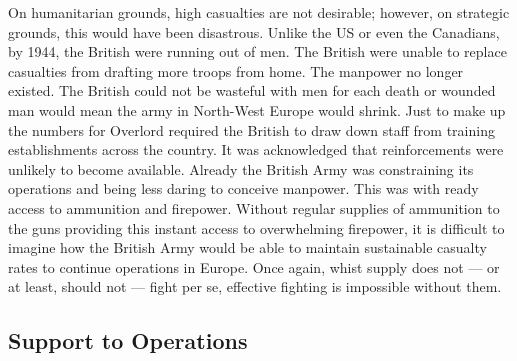 \documentclass[noraggedright]{turabian-researchpaper}
\begin{document}
On humanitarian grounds, high casualties are not desirable; however, on 
strategic grounds, this would have been disastrous.  Unlike the US or
even the Canadians, by 1944, the British were running out of men.  The 
British were unable to replace casualties from drafting more troops from 
home.  The manpower no longer existed.  The British could not be wasteful 
with men for each death or wounded man would mean the army in North-West 
Europe would shrink.  %
Just to make up the numbers for Overlord required the British to draw down
staff from training establishments across the country.  It was acknowledged
that reinforcements were unlikely to become available. %
Already the British Army was constraining its operations and being less 
daring to conceive manpower.  This was with ready access to ammunition and
firepower.  Without regular supplies of ammunition to the guns providing this
instant access to overwhelming firepower, it is difficult to imagine how the 
British Army would be able to maintain sustainable casualty rates to continue
operations in Europe.  Once again, whist supply does not --- or at least,
should not --- fight per se, effective fighting is impossible without them.



	\subsection{Support to Operations}
		



		
\end{document}
